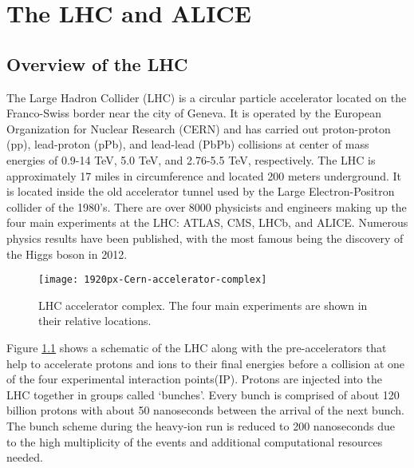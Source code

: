 \chapter{The LHC and ALICE}\label{ch:alice}

\section{Overview of the LHC}\label{sec:LHC}
The Large Hadron Collider (LHC)\cite{doi:10.1142/S0217751X13300354} is a circular particle accelerator located on the Franco-Swiss border near the city of Geneva.  It is operated by the European Organization for Nuclear Research (CERN) and has carried out proton-proton (pp), lead-proton (pPb), and lead-lead (PbPb) collisions at center of mass energies of  0.9-14 TeV, 5.0 TeV, and 2.76-5.5 TeV, respectively.  The LHC is approximately 17 miles in circumference and located 200 meters underground.  It is located inside the old accelerator tunnel used by the Large Electron-Positron\cite{Taylor:2017edx} collider of the 1980's.  There are over 8000 physicists and engineers making up the four main experiments at the LHC: ATLAS\cite{Aad:2008zzm}, CMS\cite{Chatrchyan:2008aa}, LHCb\cite{Alves:2008zz}, and ALICE\cite{Aamodt:2008zz}.   Numerous physics results have been published, with the most famous being the discovery of the Higgs boson in 2012\cite{Chatrchyan:2012xdj}\cite{Aad:2012tfa}.

\begin{figure}[h]
\texttt{[image: 1920px-Cern-accelerator-complex]}
\centering
\caption{LHC accelerator complex.  The four main experiments are shown in their relative locations\cite{Mobs:2197559}.}
\label{fig:AccComp}
\end{figure}

Figure \ref{fig:AccComp} shows a schematic of the LHC along with the pre-accelerators that help to accelerate protons and ions to their final energies before a collision at one of the four experimental interaction points(IP).  Protons are injected into the LHC together in groups called `bunches'.  Every bunch is comprised of about 120 billion protons with about 50 nanoseconds between the arrival of the next bunch.  The bunch scheme during the heavy-ion run is reduced to 200 nanoseconds due to the high multiplicity of the events and additional computational resources needed. 

